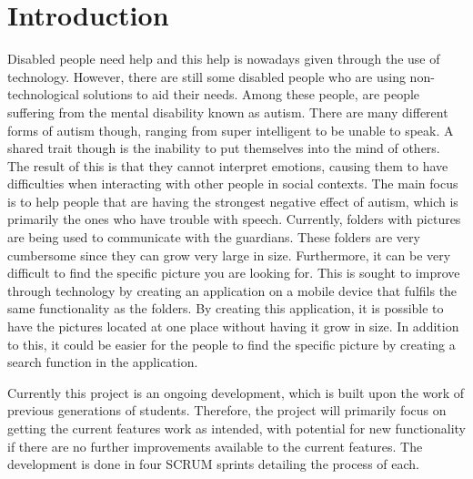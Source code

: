 \chapter{Introduction}

Disabled people need help and this help is nowadays given through the use of technology.
However, there are still some disabled people who are using non-technological solutions to aid their needs.
Among these people, are people suffering from the mental disability known as autism.
There are many different forms of autism though, ranging from super intelligent to be unable to speak.
A shared trait though is the inability to put themselves into the mind of others.
The result of this is that they cannot interpret emotions, causing them to have difficulties when interacting with other people in social contexts.
The main focus is to help people that are having the strongest negative effect of autism, which is primarily the ones who have trouble with speech.
Currently, folders with pictures are being used to communicate with the guardians.
These folders are very cumbersome since they can grow very large in size.
Furthermore, it can be very difficult to find the specific picture you are looking for.
This is sought to improve through technology by creating an application on a mobile device that fulfils the same functionality as the folders.
By creating this application, it is possible to have the pictures located at one place without having it grow in size.
In addition to this, it could be easier for the people to find the specific picture by creating a search function in the application.

Currently this project is an ongoing development, which is built upon the work of previous generations of students.
Therefore, the project will primarily focus on getting the current features work as intended, with potential for new functionality if there are no further improvements available to the current features.
The development is done in four SCRUM sprints detailing the process of each.
